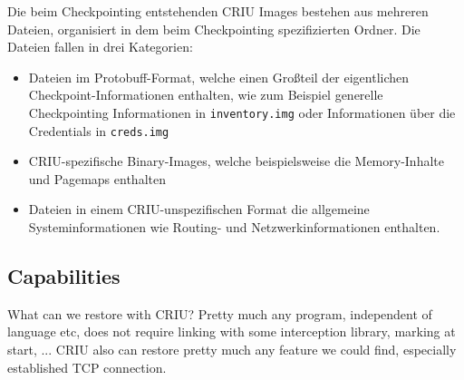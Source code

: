\documentclass[a4paper]{article}
\begin{document}
Die beim Checkpointing entstehenden CRIU Images bestehen aus mehreren Dateien, organisiert in dem beim Checkpointing spezifizierten Ordner. Die Dateien fallen in drei Kategorien: \begin{itemize}
    \item Dateien im Protobuff-Format, welche einen Großteil der eigentlichen Checkpoint-Informationen enthalten, wie zum Beispiel generelle Checkpointing Informationen in \texttt{inventory.img} oder Informationen über die Credentials in \texttt{creds.img}
    \item CRIU-spezifische Binary-Images, welche beispielsweise die Memory-Inhalte und Pagemaps enthalten
    \item Dateien in einem CRIU-unspezifischen Format die allgemeine Systeminformationen wie Routing- und Netzwerkinformationen enthalten.
\end{itemize}

\subsection{Capabilities}

What can we restore with CRIU? Pretty much any program, independent of language etc, does not require linking with some interception library, marking at start, ... CRIU also can restore pretty much any feature we could find, especially established TCP connection.
\end{document}
